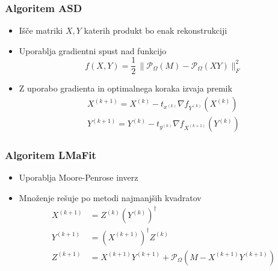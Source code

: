 \documentclass{beamer}
\newcommand{\fnorm}[1]{\lVert#1\rVert_F}
\newcommand{\proj}{\mathcal{P}_\Omega}
\begin{document}
\begin{frame}
  \frametitle{Algoritem ASD}
  \begin{itemize}
    \item Išče matriki $X, Y$ katerih \alert{produkt} bo enak rekonstrukciji
    \item Uporablja \alert{gradientni spust} nad funkcijo \[
            f(X, Y) = \frac{1}{2}\, \fnorm{\proj(M) - \proj(XY)}^2
          \]
    \item Z uporabo \alert{gradienta} in \alert{optimalnega koraka} izvaja premik
          \begin{align*}
            X^{(k+1)} = X^{(k)} - t_{x^{(k)}} \nabla f_{Y^{(k)}}(X^{(k)}) \\
            Y^{(k+1)} = Y^{(k)} - t_{y^{(k)}} \nabla f_{X^{(k+1)}}(Y^{(k)})
          \end{align*}
  \end{itemize}
\end{frame}

\begin{frame}
  \frametitle{Algoritem LMaFit}
  \begin{itemize}
    \item Uporablja \alert{Moore-Penrose inverz}
    \item Množenje rešuje po \alert{metodi najmanjših kvadratov}
          \begin{align*}
            X^{(k+1)} & = Z^{(k)}(Y^{(k)})^\dagger                           \\
            Y^{(k+1)} & = (X^{(k+1)})^\dagger Z^{(k)}                        \\
            Z^{(k+1)} & = X^{(k+1)}Y^{(k+1)} + \proj(M - X^{(k+1)}Y^{(k+1)})
          \end{align*}
  \end{itemize}
\end{frame}
\end{document}
